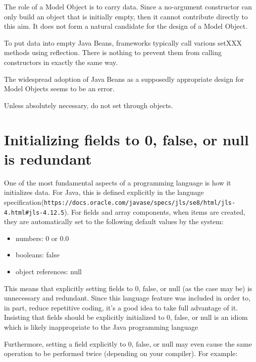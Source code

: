 The role of a Model Object is to carry data. Since a no-argument constructor can only build an object that is initially empty, then it cannot contribute directly to this aim. It does not form a natural candidate for the design of a Model Object.

To put data into empty Java Beans, frameworks typically call various setXXX methods using reflection. There is nothing to prevent them from calling constructors in exactly the same way.

The widespread adoption of Java Beans as a supposedly appropriate design for Model Objects seems to be an error.

\begin{marker}
    Unless absolutely necessary, do not set through objects.
\end{marker}

\section{Initializing fields to 0, false, or null is redundant}

One of the most fundamental aspects of a programming language is how it initializes data. For Java, this is defined explicitly in the language specification(\lstinline{https://docs.oracle.com/javase/specs/jls/se8/html/jls-4.html#jls-4.12.5}). For fields and array components, when items are created, they are automatically set to the following default values by the system:

\begin{itemize}
    \item numbers: 0 or 0.0
    \item booleans: false
    \item object references: null
\end{itemize}

This means that explicitly setting fields to 0, false, or null (as the case may be) is unnecessary and redundant. Since this language feature was included in order to, in part, reduce repetitive coding, it’s a good idea to take full advantage of it. Insisting that fields should be explicitly initialized to 0, false, or null is an idiom which is likely inappropriate to the Java programming language

Furthermore, setting a field explicitly to 0, false, or null may even cause the same operation to be performed twice (depending on your compiler). For example:

